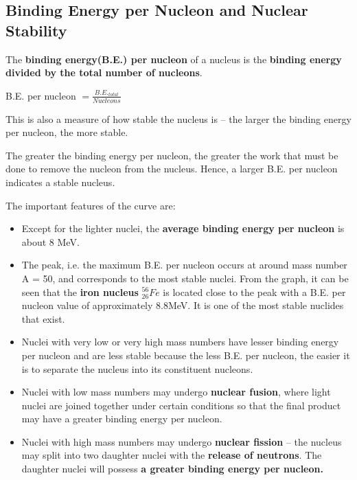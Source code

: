 \subsection{Binding Energy per Nucleon and Nuclear Stability}
The \textbf{binding energy(B.E.) per nucleon} of a nucleus is the \textbf{binding energy divided by the total number of nucleons}.
\begin{defi}
B.E. per nucleon $= \frac{B.E._{total}}{Nucleons}$
\end{defi}

This is also a measure of how stable the nucleus is -- the larger the binding energy per nucleon, the more stable.

The greater the binding energy per nucleon, the greater the work that must be done to remove the nucleon from the nucleus. Hence, a larger B.E. per nucleon indicates a stable nucleus.

The important features of the curve are:
\begin{itemize}
\item Except for the lighter nuclei, the \textbf{average binding energy per nucleon} is about 8 MeV.
\item The peak, i.e. the maximum B.E. per nucleon occurs at around mass number A = 50, and corresponds to the most stable nuclei. From the graph, it can be seen that the \textbf{iron nucleus} $^{56}_{26}Fe$ is located close to the peak with a B.E. per nucleon value of approximately 8.8MeV. It is one of the most stable nuclides that exist.
\item Nuclei with very low or very high mass numbers have lesser binding energy per nucleon and are less stable because the less B.E. per nucleon, the easier it is to separate the nucleus into its constituent nucleons.
\item Nuclei with low mass numbers may undergo \textbf{nuclear fusion}, where light nuclei are joined together under certain conditions so that the final product may have a greater binding energy per nucleon.
\item Nuclei with high mass numbers may undergo \textbf{nuclear fission} -- the nucleus may split into two daughter nuclei with the \textbf{release of neutrons}. The daughter nuclei will possess \textbf{a greater binding energy per nucleon.}
\end{itemize}

\begin{center}
\end{center}
